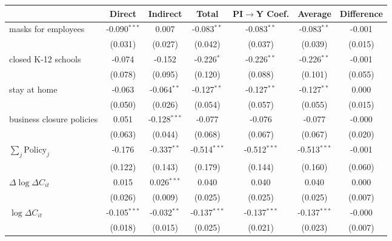 
\begin{tabular}{lccccc|>{}c}
\toprule
  & Direct & Indirect & Total & PI$\to$Y Coef. & Average & Difference\\
\midrule
masks for employees & -0.090$^{***}$ & 0.007 & -0.083$^{**}$ & -0.083$^{**}$ & -0.083$^{**}$ & -0.001\\
 & (0.031) & (0.027) & (0.042) & (0.037) & (0.039) & (0.015)\\
closed K-12 schools & -0.074 & -0.152 & -0.226$^{*}$ & -0.226$^{**}$ & -0.226$^{**}$ & -0.001\\
 & (0.078) & (0.095) & (0.120) & (0.088) & (0.101) & (0.055)\\
stay at home & -0.063 & -0.064$^{**}$ & -0.127$^{**}$ & -0.127$^{**}$ & -0.127$^{**}$ & 0.000\\
 & (0.050) & (0.026) & (0.054) & (0.057) & (0.055) & (0.015)\\
business closure policies & 0.051 & -0.128$^{***}$ & -0.077 & -0.076 & -0.077 & -0.000\\
 & (0.063) & (0.044) & (0.068) & (0.067) & (0.067) & (0.020)\\
$\sum_j \mathrm{Policy}_j$ & -0.176 & -0.337$^{**}$ & -0.514$^{***}$ & -0.512$^{***}$ & -0.513$^{***}$ & -0.001\\
 & (0.122) & (0.143) & (0.179) & (0.144) & (0.160) & (0.060)\\
$\Delta \log \Delta C_{it}$ & 0.015 & 0.026$^{***}$ & 0.040 & 0.040 & 0.040 & 0.000\\
 & (0.026) & (0.009) & (0.025) & (0.025) & (0.025) & (0.007)\\
$\log \Delta C_{it}$ & -0.105$^{***}$ & -0.032$^{**}$ & -0.137$^{***}$ & -0.137$^{***}$ & -0.137$^{***}$ & -0.000\\
 & (0.018) & (0.015) & (0.025) & (0.021) & (0.023) & (0.007)\\
\bottomrule
\end{tabular}
